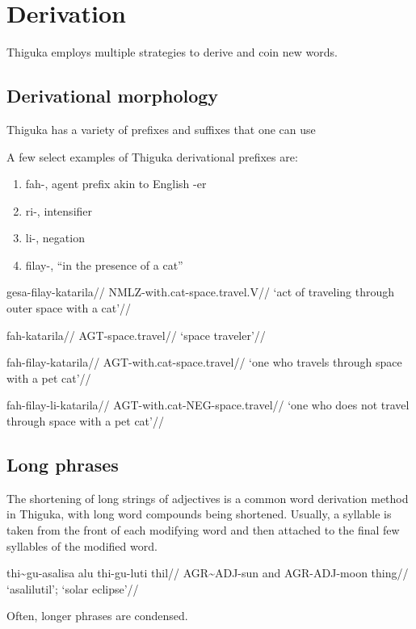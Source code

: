 \section{Derivation}
Thiguka employs multiple strategies to derive and coin new words.

\subsection{Derivational morphology}
Thiguka has a variety of prefixes and suffixes that one can use 

A few select examples of Thiguka derivational prefixes are:

\begin{enumerate}
    \item fah-, agent prefix akin to English -er
    \item ri-, intensifier
    \item li-, negation
    \item filay-, ``in the presence of a cat''
\end{enumerate}

\ex
\begingl
\gla  gesa-filay-katarila//
\glb  NMLZ-with.cat-space.travel.V//
\glft `act of traveling through outer space with a cat'//
\endgl
\xe

\ex
\begingl
\gla  fah-katarila//
\glb  AGT-space.travel//
\glft `space traveler'//
\endgl
\xe

\ex
\begingl
\gla  fah-filay-katarila//
\glb  AGT-with.cat-space.travel//
\glft `one who travels through space with a pet cat'//
\endgl
\xe

\ex
\begingl
\gla  fah-filay-li-katarila//
\glb  AGT-with.cat-NEG-space.travel//
\glft `one who does not travel through space with a pet cat'//
\endgl
\xe

\subsection{Long phrases}
The shortening of long strings of adjectives is a common word derivation method in Thiguka, with long word compounds being shortened.
Usually, a syllable is taken from the front of each modifying word and then attached to the final few syllables of the modified word.

\ex
\begingl
\gla   thi\~{}gu-asalisa alu thi-gu-luti thil//
\glb   AGR\~{}ADJ-sun and AGR-ADJ-moon thing//
\glft  `asalilutil'; `solar eclipse'//
\endgl
\xe

Often, longer phrases are condensed.


